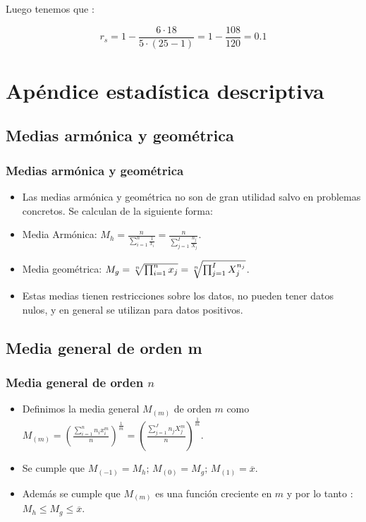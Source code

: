 \begin{frame}
Luego tenemos que :

$$
r_s = 1 -  \frac{6\cdot 18}{5\cdot (25-1)}= 1-\frac{108}{120}= 0.1
$$

\end{frame}






\section{Apéndice estadística descriptiva}
\subsection{Medias armónica y geométrica}
\begin{frame}
\frametitle{Medias armónica y geométrica}
\begin{itemize}
\item Las medias armónica y geométrica no son de gran utilidad salvo en problemas concretos. Se
calculan de la siguiente forma:
\item Media Armónica: $M_{h}=\frac{n}{\sum\limits_{i=1}^{n} \frac{1}{x_i}}=\frac{n}{\sum\limits_{j=1}^{I} \frac{n_j}{X_j}}$.
\item Media geométrica: $M_g=\root n\of{\prod_{i=1}^{n} x_j} =\root n\of{\prod_{j=1}^{I} X_j^{n_j}}$.
\item Estas medias tienen restricciones sobre los datos, no pueden tener datos nulos, y en
general se utilizan para datos positivos.
\end{itemize}
\end{frame}


\subsection{Media general de orden m}

\begin{frame}
\frametitle{Media general de orden $n$}
\begin{itemize}
\item Definimos la media general $M_{(m)}$ de orden $m$ como 
$M_{(m) }=\left(\frac{\sum_{i=1}^n  n_i x_i^m}{n}\right)^{\frac{1}{m}}=
\left(\frac{\sum_{j=1}^J  n_j X_j^m}{n}\right)^{\frac{1}{m}}$.
\item Se cumple que $M_{(-1)}=M_h;\,  M_{(0)}=M_g;\,  M_{(1)}=\overline{x}$.
\item Además se cumple que $M_{(m)}$ es una función creciente en $m$ y por lo tanto :
$M_h\leq M_g\leq \overline{x}.$
\end{itemize}
\end{frame}

